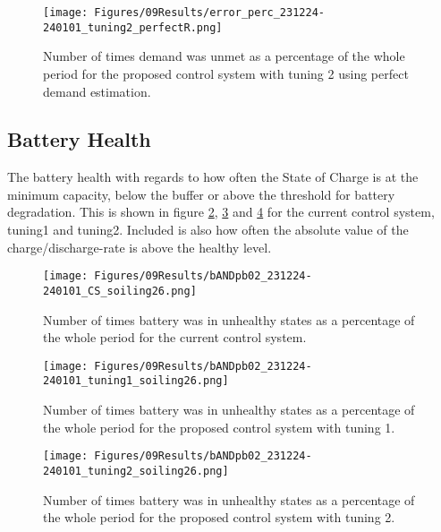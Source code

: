 \begin{figure}[h]
    \centering
    \texttt{[image: Figures/09Results/error\_perc\_231224-240101\_tuning2\_perfectR.png]}
    \caption[Unmet demand portion proposed control system 2 perfect R]{Number of times demand was unmet as a percentage of the whole period for the proposed control system with tuning 2 using perfect demand estimation. }
    \label{fig:error_perc_231224-240101_tuning2_perfectR}
\end{figure}

\subsection{Battery Health}

The battery health with regards to how often the State of Charge is at the minimum capacity, below the buffer or above the threshold for battery degradation. This is shown in figure \ref{fig:bANDpb02_231224-240101_CS_soiling26}, \ref{fig:bANDpb02_231224-240101_tuning1_soiling26} and \ref{fig:bANDpb02_231224-240101_tuning2_soiling26} for the current control system, tuning1 and tuning2. Included is also how often the absolute value of the charge/discharge-rate is above the healthy level. 

\begin{figure}[h]
    \centering
    \texttt{[image: Figures/09Results/bANDpb02\_231224-240101\_CS\_soiling26.png]}
    \caption[Battery results current control system]{Number of times battery was in unhealthy states as a percentage of the whole period for the current control system. }
    \label{fig:bANDpb02_231224-240101_CS_soiling26}
\end{figure}


\begin{figure}[h]
    \centering
    \texttt{[image: Figures/09Results/bANDpb02\_231224-240101\_tuning1\_soiling26.png]}
    \caption[Battery results proposed control system 1]{Number of times battery was in unhealthy states as a percentage of the whole period for the proposed control system with tuning 1. }
    \label{fig:bANDpb02_231224-240101_tuning1_soiling26}
\end{figure}

\begin{figure}[h]
    \centering
    \texttt{[image: Figures/09Results/bANDpb02\_231224-240101\_tuning2\_soiling26.png]}
    \caption[Battery results proposed control system 2]{Number of times battery was in unhealthy states as a percentage of the whole period for the proposed control system with tuning 2. }
    \label{fig:bANDpb02_231224-240101_tuning2_soiling26}
\end{figure}

